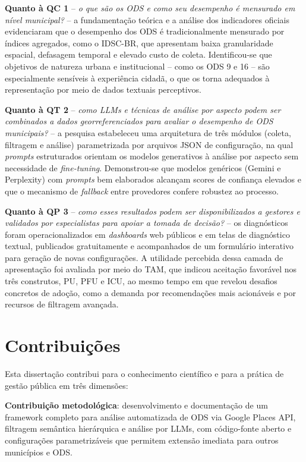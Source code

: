 \textbf{Quanto à QC 1} -- \textit{o que são os ODS e como seu desempenho é mensurado em nível municipal?} -- a fundamentação teórica e a análise dos indicadores oficiais evidenciaram que o desempenho dos ODS é tradicionalmente mensurado por índices agregados, como o IDSC-BR, que apresentam baixa granularidade espacial, defasagem temporal e elevado custo de coleta. Identificou-se que objetivos de natureza urbana e institucional -- como os ODS 9 e 16 -- são especialmente sensíveis à experiência cidadã, o que os torna adequados à representação por meio de dados textuais perceptivos.

\textbf{Quanto à QT 2} -- \textit{como \glspl{LLM} e técnicas de análise por aspecto podem ser combinados a dados georreferenciados para avaliar o desempenho de ODS municipais?} -- a pesquisa estabeleceu uma arquitetura de três módulos (coleta, filtragem e análise) parametrizada por arquivos JSON de configuração, na qual \textit{prompts} estruturados orientam os modelos generativos à análise por aspecto sem necessidade de \textit{fine-tuning}. Demonstrou-se que modelos genéricos (Gemini e Perplexity) com \textit{prompts} bem elaborados alcançam scores de confiança elevados e que o mecanismo de \textit{fallback} entre provedores confere robustez ao processo.

\textbf{Quanto à QP 3} -- \textit{como esses resultados podem ser disponibilizados a gestores e validados por especialistas para apoiar a tomada de decisão?} -- os diagnósticos foram operacionalizados em \textit{dashboards} web públicos e em telas de diagnóstico textual, publicados gratuitamente e acompanhados de um formulário interativo para geração de novas configurações. A utilidade percebida dessa camada de apresentação foi avaliada por meio do \gls{TAM}, que indicou aceitação favorável nos três construtos, \gls{PU}, \gls{PFU} e \gls{ICU}, ao mesmo tempo em que revelou desafios concretos de adoção, como a demanda por recomendações mais acionáveis e por recursos de filtragem avançada.

\section{Contribuições}
\label{sec:contribuicoes-finais}

Esta dissertação contribui para o conhecimento científico e para a prática de gestão pública em três dimensões:

\textbf{Contribuição metodológica}: desenvolvimento e documentação de um framework completo para análise automatizada de ODS via Google Places API, filtragem semântica hierárquica e análise por LLMs, com código-fonte aberto e configurações parametrizáveis que permitem extensão imediata para outros municípios e ODS.


